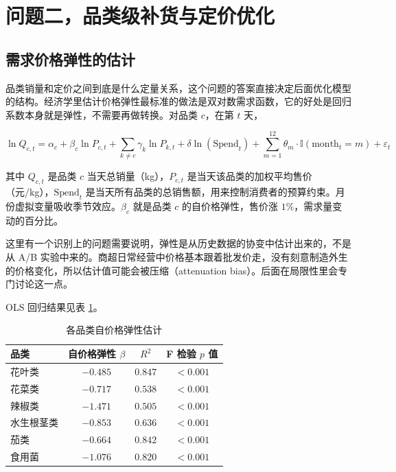 \section{问题二，品类级补货与定价优化}

\subsection{需求价格弹性的估计}

品类销量和定价之间到底是什么定量关系，这个问题的答案直接决定后面优化模型的结构。经济学里估计价格弹性最标准的做法是双对数需求函数，它的好处是回归系数本身就是弹性，不需要再做转换。对品类 $c$，在第 $t$ 天，

\begin{equation}
\ln Q_{c,t} = \alpha_c + \beta_c \ln P_{c,t} + \sum_{k \neq c} \gamma_k \ln P_{k,t} + \delta \ln(\text{Spend}_t) + \sum_{m=1}^{12} \theta_m \cdot \mathbb{I}(\text{month}_t = m) + \varepsilon_t
\end{equation}

其中 $Q_{c,t}$ 是品类 $c$ 当天总销量（kg），$P_{c,t}$ 是当天该品类的加权平均售价（元/kg），$\text{Spend}_t$ 是当天所有品类的总销售额，用来控制消费者的预算约束。月份虚拟变量吸收季节效应。$\beta_c$ 就是品类 $c$ 的自价格弹性，售价涨 $1\%$，需求量变动的百分比。

这里有一个识别上的问题需要说明，弹性是从历史数据的协变中估计出来的，不是从 A/B 实验中来的。商超日常经营中价格基本跟着批发价走，没有刻意制造外生的价格变化，所以估计值可能会被压缩（attenuation bias）。后面在局限性里会专门讨论这一点。

OLS 回归结果见表 \ref{tab:q2_elasticity}。

\begin{table}[H]
\centering
\caption{各品类自价格弹性估计}
\label{tab:q2_elasticity}
\begin{tabular}{lccc}
\hline
品类 & 自价格弹性 $\beta$ & $R^2$ & F 检验 $p$ 值 \\
\hline
花叶类 & $-0.485$ & $0.847$ & $<0.001$ \\
花菜类 & $-0.717$ & $0.538$ & $<0.001$ \\
辣椒类 & $-1.471$ & $0.505$ & $<0.001$ \\
水生根茎类 & $-0.853$ & $0.636$ & $<0.001$ \\
茄类 & $-0.664$ & $0.842$ & $<0.001$ \\
食用菌 & $-1.076$ & $0.820$ & $<0.001$ \\
\hline
\end{tabular}
\end{table}


